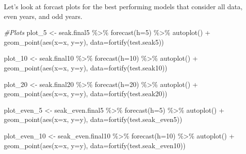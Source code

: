 \documentclass[
]{article}
\newenvironment{Shaded}{\begin{snugshade}}{\end{snugshade}}
\newcommand{\AttributeTok}[1]{\textcolor[rgb]{0.77,0.63,0.00}{#1}}
\newcommand{\CommentTok}[1]{\textcolor[rgb]{0.56,0.35,0.01}{\textit{#1}}}
\newcommand{\DecValTok}[1]{\textcolor[rgb]{0.00,0.00,0.81}{#1}}
\newcommand{\FunctionTok}[1]{\textcolor[rgb]{0.00,0.00,0.00}{#1}}
\newcommand{\NormalTok}[1]{#1}
\newcommand{\OtherTok}[1]{\textcolor[rgb]{0.56,0.35,0.01}{#1}}
\newcommand{\SpecialCharTok}[1]{\textcolor[rgb]{0.00,0.00,0.00}{#1}}
\begin{document}
Let's look at forcast plots for the best performing models that consider
all data, even years, and odd years.

\begin{Shaded}
\begin{Highlighting}[]
\CommentTok{\#Plots }
\NormalTok{plot\_5 }\OtherTok{\textless{}{-}}\NormalTok{ seak.final5 }\SpecialCharTok{\%\textgreater{}\%}
  \FunctionTok{forecast}\NormalTok{(}\AttributeTok{h=}\DecValTok{5}\NormalTok{) }\SpecialCharTok{\%\textgreater{}\%}
  \FunctionTok{autoplot}\NormalTok{() }\SpecialCharTok{+} \FunctionTok{geom\_point}\NormalTok{(}\FunctionTok{aes}\NormalTok{(}\AttributeTok{x=}\NormalTok{x, }\AttributeTok{y=}\NormalTok{y), }\AttributeTok{data=}\FunctionTok{fortify}\NormalTok{(test.seak5))}

\NormalTok{plot\_10 }\OtherTok{\textless{}{-}}\NormalTok{ seak.final10 }\SpecialCharTok{\%\textgreater{}\%}
  \FunctionTok{forecast}\NormalTok{(}\AttributeTok{h=}\DecValTok{10}\NormalTok{) }\SpecialCharTok{\%\textgreater{}\%}
  \FunctionTok{autoplot}\NormalTok{() }\SpecialCharTok{+} \FunctionTok{geom\_point}\NormalTok{(}\FunctionTok{aes}\NormalTok{(}\AttributeTok{x=}\NormalTok{x, }\AttributeTok{y=}\NormalTok{y), }\AttributeTok{data=}\FunctionTok{fortify}\NormalTok{(test.seak10))}

\NormalTok{plot\_20 }\OtherTok{\textless{}{-}}\NormalTok{ seak.final20 }\SpecialCharTok{\%\textgreater{}\%}
  \FunctionTok{forecast}\NormalTok{(}\AttributeTok{h=}\DecValTok{20}\NormalTok{) }\SpecialCharTok{\%\textgreater{}\%}
  \FunctionTok{autoplot}\NormalTok{() }\SpecialCharTok{+} \FunctionTok{geom\_point}\NormalTok{(}\FunctionTok{aes}\NormalTok{(}\AttributeTok{x=}\NormalTok{x, }\AttributeTok{y=}\NormalTok{y), }\AttributeTok{data=}\FunctionTok{fortify}\NormalTok{(test.seak20))}

\NormalTok{plot\_even\_5 }\OtherTok{\textless{}{-}}\NormalTok{ seak\_even.final5 }\SpecialCharTok{\%\textgreater{}\%}
  \FunctionTok{forecast}\NormalTok{(}\AttributeTok{h=}\DecValTok{5}\NormalTok{) }\SpecialCharTok{\%\textgreater{}\%}
  \FunctionTok{autoplot}\NormalTok{() }\SpecialCharTok{+} \FunctionTok{geom\_point}\NormalTok{(}\FunctionTok{aes}\NormalTok{(}\AttributeTok{x=}\NormalTok{x, }\AttributeTok{y=}\NormalTok{y), }\AttributeTok{data=}\FunctionTok{fortify}\NormalTok{(test.seak\_even5))}

\NormalTok{plot\_even\_10 }\OtherTok{\textless{}{-}}\NormalTok{ seak\_even.final10 }\SpecialCharTok{\%\textgreater{}\%}
  \FunctionTok{forecast}\NormalTok{(}\AttributeTok{h=}\DecValTok{10}\NormalTok{) }\SpecialCharTok{\%\textgreater{}\%}
  \FunctionTok{autoplot}\NormalTok{() }\SpecialCharTok{+} \FunctionTok{geom\_point}\NormalTok{(}\FunctionTok{aes}\NormalTok{(}\AttributeTok{x=}\NormalTok{x, }\AttributeTok{y=}\NormalTok{y), }\AttributeTok{data=}\FunctionTok{fortify}\NormalTok{(test.seak\_even10))}


\end{Highlighting}
\end{Shaded}
\end{document}
